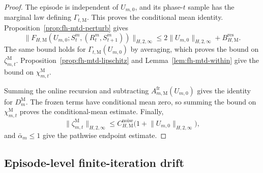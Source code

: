 \documentclass{article}
\begin{document}
\begin{proof}
The episode is independent of $U_{m,0}$, and its phase-$t$ sample has the marginal law defining $\Gamma_{t,\mathrm M}$. This proves the conditional mean identity. Proposition~\ref{prop:fh-mtd-perturb} gives
\begin{equation}
\lVert F_{H,\mathrm M}(U_{m,0};S_t^m,(R_t^m,S_{t+1}^m))\rVert_{H,2,\infty}\le2\lVert U_{m,0}\rVert_{H,2,\infty}+B_{H,\mathrm M}^{\mathrm{res}}.
\end{equation}
The same bound holds for $\Gamma_{t,\mathrm M}(U_{m,0})$ by averaging, which proves the bound on $\zeta_{m,t}^{\mathrm M}$. Proposition~\ref{prop:fh-mtd-lipschitz} and Lemma~\ref{lem:fh-mtd-within} give the bound on $\chi_{m,t}^{\mathrm M}$.

Summing the online recursion and subtracting $A_{m,\mathrm M}^{\mathrm{fr}}(U_{m,0})$ gives the identity for $D_m^{\mathrm M}$. The frozen terms have conditional mean zero, so summing the bound on $\chi_{m,t}^{\mathrm M}$ proves the conditional-mean estimate. Finally,
\begin{equation}
\lVert\zeta_{m,t}^{\mathrm M}\rVert_{H,2,\infty}\le C_{H,\mathrm M}^{\mathrm{noise}}\bigl(1+\lVert U_{m,0}\rVert_{H,2,\infty}\bigr),
\end{equation}
and $\bar\alpha_m\le1$ give the pathwise endpoint estimate.
\end{proof}

\subsection{Episode-level finite-iteration drift}
\label{sec:fh-mtd-drift-app}
\end{document}
